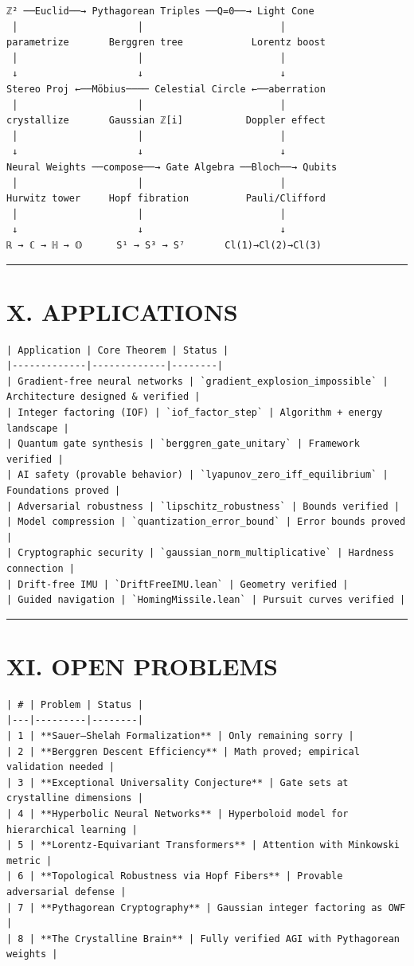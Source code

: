 \documentclass[12pt,a4paper,openany]{book}
\begin{document}
\begin{verbatim}
ℤ² ──Euclid──→ Pythagorean Triples ──Q=0──→ Light Cone
 │                     │                        │
parametrize       Berggren tree            Lorentz boost
 │                     │                        │
 ↓                     ↓                        ↓
Stereo Proj ←──Möbius──── Celestial Circle ←──aberration
 │                     │                        │
crystallize       Gaussian ℤ[i]           Doppler effect
 │                     │                        │
 ↓                     ↓                        ↓
Neural Weights ──compose──→ Gate Algebra ──Bloch──→ Qubits
 │                     │                        │
Hurwitz tower     Hopf fibration          Pauli/Clifford
 │                     │                        │
 ↓                     ↓                        ↓
ℝ → ℂ → ℍ → 𝕆      S¹ → S³ → S⁷       Cl(1)→Cl(2)→Cl(3)
\end{verbatim}

\bigskip\hrule\bigskip

\section{X. APPLICATIONS}

\begin{verbatim}
| Application | Core Theorem | Status |
|-------------|-------------|--------|
| Gradient-free neural networks | `gradient_explosion_impossible` | Architecture designed & verified |
| Integer factoring (IOF) | `iof_factor_step` | Algorithm + energy landscape |
| Quantum gate synthesis | `berggren_gate_unitary` | Framework verified |
| AI safety (provable behavior) | `lyapunov_zero_iff_equilibrium` | Foundations proved |
| Adversarial robustness | `lipschitz_robustness` | Bounds verified |
| Model compression | `quantization_error_bound` | Error bounds proved |
| Cryptographic security | `gaussian_norm_multiplicative` | Hardness connection |
| Drift-free IMU | `DriftFreeIMU.lean` | Geometry verified |
| Guided navigation | `HomingMissile.lean` | Pursuit curves verified |
\end{verbatim}

\bigskip\hrule\bigskip

\section{XI. OPEN PROBLEMS}

\begin{verbatim}
| # | Problem | Status |
|---|---------|--------|
| 1 | **Sauer–Shelah Formalization** | Only remaining sorry |
| 2 | **Berggren Descent Efficiency** | Math proved; empirical validation needed |
| 3 | **Exceptional Universality Conjecture** | Gate sets at crystalline dimensions |
| 4 | **Hyperbolic Neural Networks** | Hyperboloid model for hierarchical learning |
| 5 | **Lorentz-Equivariant Transformers** | Attention with Minkowski metric |
| 6 | **Topological Robustness via Hopf Fibers** | Provable adversarial defense |
| 7 | **Pythagorean Cryptography** | Gaussian integer factoring as OWF |
| 8 | **The Crystalline Brain** | Fully verified AGI with Pythagorean weights |
\end{verbatim}
\end{document}
